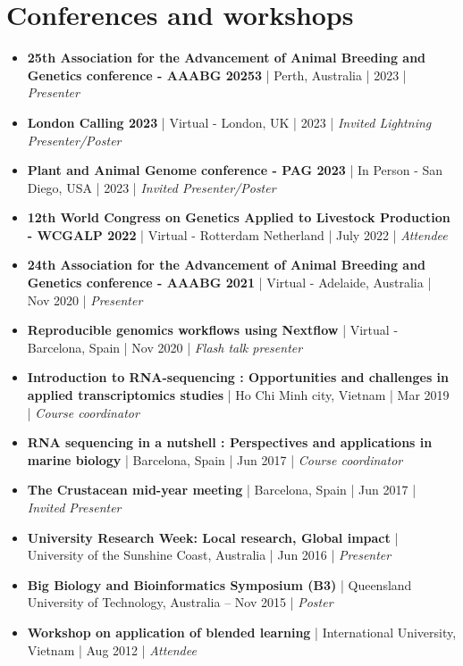 \documentclass[letterpaper,11pt]{article}
\newcommand{\resumeBlack}[1]{\item\small{{#1}}}
\newcommand{\resumeItemListStart}{\begin{itemize}}
\newcommand{\resumeItemListEnd}{\end{itemize}}
\begin{document}
  
\section{Conferences and workshops}
  \resumeItemListStart
    \resumeBlack{\textbf{25th Association for the Advancement of Animal Breeding and Genetics conference - AAABG 20253}  | Perth, Australia | 2023 | \textit{Presenter}}
    \resumeBlack{\textbf{London Calling 2023}  | Virtual - London, UK | 2023 | \textit{Invited Lightning Presenter/Poster}}
    \resumeBlack{\textbf{Plant and Animal Genome conference - PAG 2023}  | In Person - San Diego, USA | 2023 | \textit{Invited Presenter/Poster}}
    \resumeBlack{\textbf{12th World Congress on Genetics Applied to Livestock Production - WCGALP 2022}  | Virtual - Rotterdam Netherland | July 2022 | \textit{Attendee}}
    \resumeBlack{\textbf{24th Association for the Advancement of Animal Breeding and Genetics conference - AAABG 2021}  | Virtual - Adelaide, Australia | Nov 2020 | \textit{Presenter}}
    \resumeBlack{\textbf{Reproducible genomics workflows using Nextflow}  | Virtual - Barcelona, Spain | Nov 2020 | \textit{Flash talk presenter}}
    \resumeBlack{\textbf{Introduction to RNA-sequencing : Opportunities and challenges in applied transcriptomics studies}  |  Ho Chi Minh city, Vietnam | Mar 2019 | \textit{Course coordinator}}
    \resumeBlack{\textbf{RNA sequencing in a nutshell : Perspectives and applications in marine biology}  |  Barcelona, Spain | Jun 2017 | \textit{Course coordinator}}
    \resumeBlack{\textbf{The Crustacean mid-year meeting} | Barcelona, Spain | Jun 2017 | \textit{Invited Presenter}}
    \resumeBlack{\textbf{University Research Week: Local research, Global impact} | University of the Sunshine Coast, Australia | Jun 2016 | \textit{Presenter}}
    \resumeBlack{\textbf{Big Biology and Bioinformatics Symposium (B3)} | Queensland University of Technology, Australia – Nov 2015 | \textit{Poster}}
    \resumeBlack{\textbf{Workshop on application of blended learning} | International University, Vietnam | Aug 2012 | \textit{Attendee}}
  \resumeItemListEnd
\end{document}
